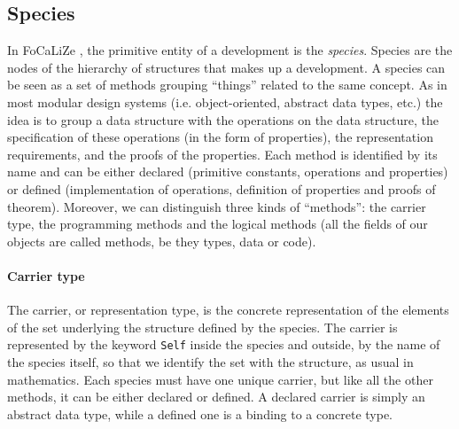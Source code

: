 \documentclass[submission,copyright,creativecommons]{eptcs}
\def\focalize{FoCaLiZe \mbox{}}
\begin{document}
\subsection{Species}


In \focalize, the primitive entity of a development is the \emph{species}.
Species are the nodes of the
hierarchy of structures that makes up a development.
A species can be seen as a set of methods grouping ``things'' related
to the same concept. As in most modular design systems
(i.e. object-oriented, abstract data types, etc.) the idea is
to group a data structure with the operations on the data structure, the
specification of these operations (in the form of properties), the
representation requirements, and the proofs of the properties.
Each method is identified by
its name and can be either declared 
(primitive constants, operations and properties)
or defined (implementation of operations, definition of properties and proofs of theorem).
Moreover, we can distinguish three kinds of ``methods'': the carrier type, the
programming methods and the logical methods (all the fields of our
objects are called methods, be they types, data or code).

\paragraph{Carrier type}
The carrier, or representation type, is the concrete representation of
the elements of the set underlying the structure defined
by the species. 
The carrier is represented by the keyword {\small \tt Self} inside
the species and outside, by the name of the species itself, so that we
identify the
set with the structure, as usual in mathematics.
Each species must have one unique carrier, but like all the other methods, it
can be either declared or defined. A declared carrier is simply an abstract 
data type, while a defined one is a binding to a concrete type.
\end{document}
